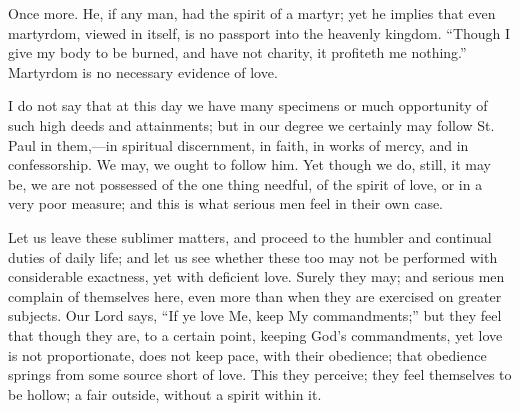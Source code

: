 Once more. He, if any man, had the spirit of a martyr; yet he
implies that even martyrdom, viewed in itself, is no passport into the
heavenly kingdom. ``Though I give my body to be burned, and have
not charity, it profiteth me nothing.'' Martyrdom is no necessary
evidence of love.

I do not say that at this day we have many specimens or much
opportunity of such high deeds and attainments; but in our degree we
certainly may follow St. Paul in them,—in spiritual discernment, in
faith, in works of mercy, and in confessorship. We may, we ought to
follow him. Yet though we do, still, it may be, we are not possessed
of the one thing needful, of the spirit of love, or in a very poor
measure; and this is what serious men feel in their own case.

Let us leave these sublimer matters, and proceed to the humbler and
continual duties of daily life; and let us see whether these too may
not be performed with considerable exactness, yet with deficient love.
Surely they may; and serious men complain of themselves here, even
more than when they are exercised on greater subjects. Our Lord says,
``If ye love Me, keep My commandments;'' but they feel that
though they are, to a certain point, keeping God's commandments, yet
love is not proportionate, does not keep pace, with their obedience;
that obedience springs from some source short of love. This they
perceive; they feel themselves to be hollow; a fair outside, without a
spirit within it.

